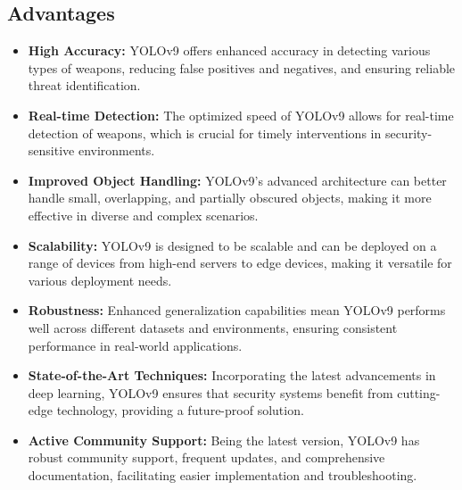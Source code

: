    \subsection{Advantages}
        \begin{itemize}
            \item \textbf{High Accuracy:} YOLOv9 offers enhanced accuracy in detecting various types of weapons, reducing false positives and negatives, and ensuring reliable threat identification.
            \item \textbf{Real-time Detection:} The optimized speed of YOLOv9 allows for real-time detection of weapons, which is crucial for timely interventions in security-sensitive environments.
            \item \textbf{Improved Object Handling:} YOLOv9's advanced architecture can better handle small, overlapping, and partially obscured objects, making it more effective in diverse and complex scenarios.
            \item \textbf{Scalability:} YOLOv9 is designed to be scalable and can be deployed on a range of devices from high-end servers to edge devices, making it versatile for various deployment needs.
            \item \textbf{Robustness:} Enhanced generalization capabilities mean YOLOv9 performs well across different datasets and environments, ensuring consistent performance in real-world applications.
            \item \textbf{State-of-the-Art Techniques:} Incorporating the latest advancements in deep learning, YOLOv9 ensures that security systems benefit from cutting-edge technology, providing a future-proof solution.
            \item \textbf{Active Community Support:} Being the latest version, YOLOv9 has robust community support, frequent updates, and comprehensive documentation, facilitating easier implementation and troubleshooting.
        \end{itemize}

